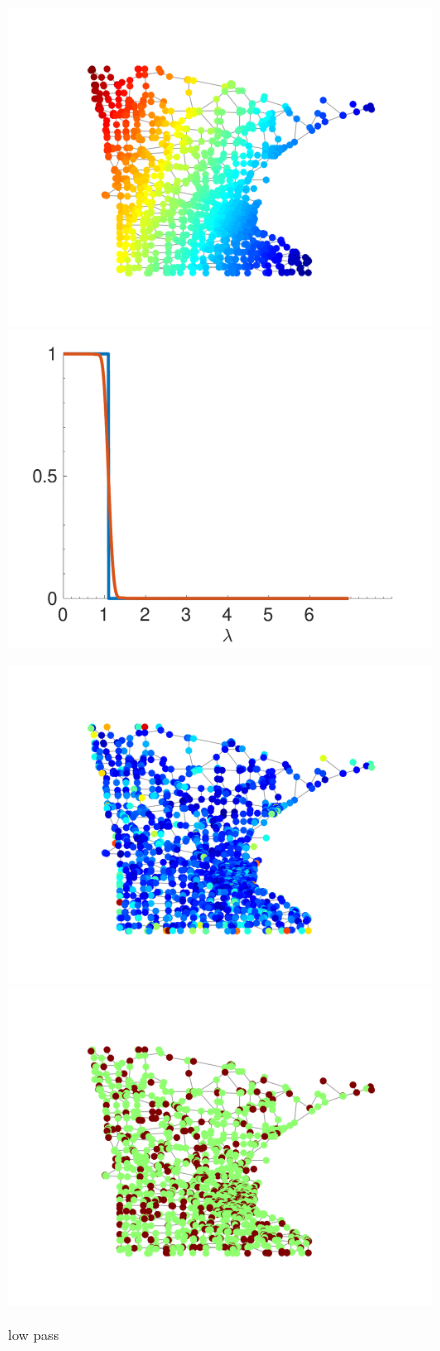 \documentclass[a4paper]{article}
\theoremstyle{definition}
\begin{document}
\begin{figure}[h!]
\centering
\includegraphics[width = 5 cm]{signal graph mn.pdf}
\includegraphics[width = 5 cm]{filter mn.pdf}

\includegraphics[width = 5 cm]{sampling weights.pdf}
\includegraphics[width = 5 cm]{selected.pdf}
\caption{low pass}
\end{figure}
\end{document}
